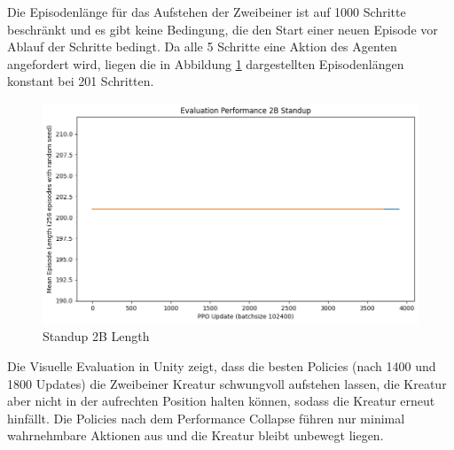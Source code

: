 Die Episodenlänge für das Aufstehen der Zweibeiner ist auf 1000 Schritte beschränkt und es gibt keine Bedingung, die den Start einer neuen Episode vor Ablauf der Schritte bedingt. Da alle 5 Schritte eine Aktion des Agenten angefordert wird, liegen die in Abbildung \ref{fig:Standup2B_Length} dargestellten Episodenlängen konstant bei 201 Schritten.

\begin{figure}[ht]
    \centering
    \includegraphics[width=0.5\linewidth]{resources/img/results/Standup2B_Length.png}
    \caption{Standup 2B Length}\label{fig:Standup2B_Length}
\end{figure}

Die Visuelle Evaluation in Unity zeigt, dass die besten Policies (nach 1400 und 1800 Updates) die Zweibeiner Kreatur schwungvoll aufstehen lassen, die Kreatur aber nicht in der aufrechten Position halten können, sodass die Kreatur erneut hinfällt. Die Policies nach dem Performance Collapse führen nur minimal wahrnehmbare Aktionen aus und die Kreatur bleibt unbewegt liegen. 






